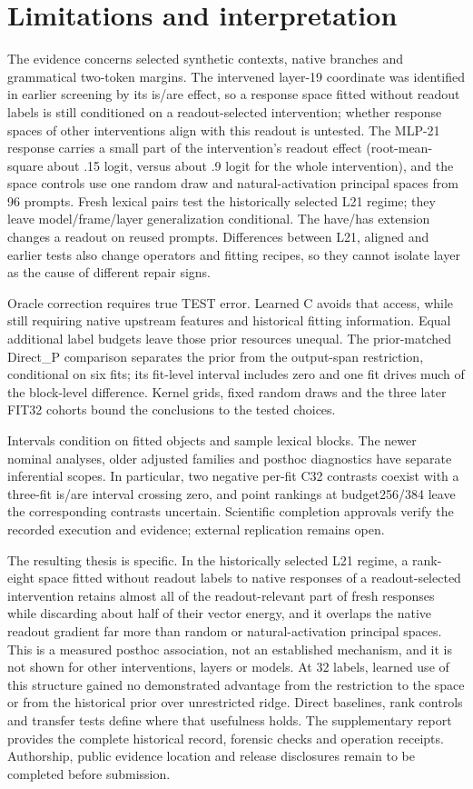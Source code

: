 \documentclass[11pt]{article}
\begin{document}
\section{Limitations and interpretation}
The evidence concerns selected synthetic contexts, native branches and grammatical two-token margins. The intervened layer-19 coordinate was identified in earlier screening by its is/are effect, so a response space fitted without readout labels is still conditioned on a readout-selected intervention; whether response spaces of other interventions align with this readout is untested. The MLP-21 response carries a small part of the intervention's readout effect (root-mean-square about .15 logit, versus about .9 logit for the whole intervention), and the space controls use one random draw and natural-activation principal spaces from 96 prompts. Fresh lexical pairs test the historically selected L21 regime; they leave model/frame/layer generalization conditional. The have/has extension changes a readout on reused prompts. Differences between L21, aligned and earlier tests also change operators and fitting recipes, so they cannot isolate layer as the cause of different repair signs.

Oracle correction requires true TEST error. Learned C avoids that access, while still requiring native upstream features and historical fitting information. Equal additional label budgets leave those prior resources unequal. The prior-matched Direct\_P comparison separates the prior from the output-span restriction, conditional on six fits; its fit-level interval includes zero and one fit drives much of the block-level difference. Kernel grids, fixed random draws and the three later FIT32 cohorts bound the conclusions to the tested choices.

Intervals condition on fitted objects and sample lexical blocks. The newer nominal analyses, older adjusted families and posthoc diagnostics have separate inferential scopes. In particular, two negative per-fit C32 contrasts coexist with a three-fit is/are interval crossing zero, and point rankings at budget256/384 leave the corresponding contrasts uncertain. Scientific completion approvals verify the recorded execution and evidence; external replication remains open.

The resulting thesis is specific. In the historically selected L21 regime, a rank-eight space fitted without readout labels to native responses of a readout-selected intervention retains almost all of the readout-relevant part of fresh responses while discarding about half of their vector energy, and it overlaps the native readout gradient far more than random or natural-activation principal spaces. This is a measured posthoc association, not an established mechanism, and it is not shown for other interventions, layers or models. At 32 labels, learned use of this structure gained no demonstrated advantage from the restriction to the space or from the historical prior over unrestricted ridge. Direct baselines, rank controls and transfer tests define where that usefulness holds. The supplementary report provides the complete historical record, forensic checks and operation receipts. Authorship, public evidence location and release disclosures remain to be completed before submission.
\end{document}
